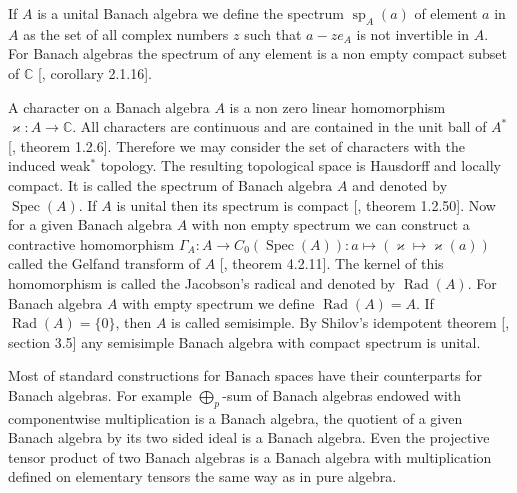 If $A$ is a unital Banach algebra we define the spectrum $\operatorname{sp}_A(a)$ of element $a$ in $A$ as the set of all complex numbers $z$ such that $a-ze_A$ is not invertible in $A$. For Banach algebras the spectrum of any element is a non empty compact subset of $\mathbb{C}$ [\cite{HelBanLocConvAlg}, corollary 2.1.16].

A character on a Banach algebra $A$ is a non zero linear homomorphism $\varkappa:A\to\mathbb{C}$. All characters are continuous and are contained in the unit ball of $A^*$  [\cite{HelBanLocConvAlg}, theorem 1.2.6]. Therefore we may consider the set of characters with the induced weak$^*$ topology. The resulting topological space is Hausdorff and locally compact. It is called the spectrum of Banach algebra $A$ and denoted by $\operatorname{Spec}(A)$. If $A$ is unital then its spectrum is compact [\cite{HelBanLocConvAlg}, theorem 1.2.50]. Now for a given Banach algebra $A$ with non empty spectrum we can construct a contractive homomorphism $\Gamma_A:A\to C_0(\operatorname{Spec}(A)):a\mapsto(\varkappa\mapsto \varkappa(a))$ called the Gelfand transform of $A$ [\cite{HelBanLocConvAlg}, theorem 4.2.11]. The kernel of this homomorphism is called the Jacobson's radical and denoted by $\operatorname{Rad}(A)$. For Banach algebra $A$ with empty spectrum we define $\operatorname{Rad}(A)=A$. If $\operatorname{Rad}(A)=\{0\}$, then $A$ is called semisimple. By Shilov's idempotent theorem [\cite{KaniBanAlg}, section 3.5] any semisimple Banach algebra with compact spectrum is unital.

Most of standard constructions for Banach spaces have their counterparts for Banach algebras. For example $\bigoplus_p$-sum of Banach algebras endowed with componentwise multiplication is a Banach algebra, the quotient of a given Banach algebra by its two sided ideal is a Banach algebra. Even the projective tensor product of two Banach algebras is a Banach algebra with multiplication defined on elementary tensors the same way as in pure algebra.


